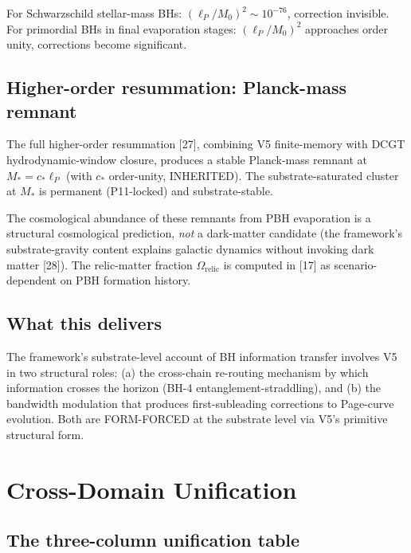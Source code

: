 \documentclass[11pt,a4paper]{article}
\begin{document}
For Schwarzschild stellar-mass BHs: $(\ell_P/M_0)^{2} \sim 10^{-76}$, correction invisible. For primordial BHs in final evaporation stages: $(\ell_P/M_0)^{2}$ approaches order unity, corrections become significant.

\subsection{Higher-order resummation: Planck-mass remnant}

The full higher-order resummation [27], combining V5 finite-memory with DCGT hydrodynamic-window closure, produces a stable Planck-mass remnant at $M_* = c_*\ell_P$ (with $c_*$ order-unity, INHERITED). The substrate-saturated cluster at $M_*$ is permanent (P11-locked) and substrate-stable.

The cosmological abundance of these remnants from PBH evaporation is a structural cosmological prediction, \emph{not} a dark-matter candidate (the framework's substrate-gravity content explains galactic dynamics without invoking dark matter [28]). The relic-matter fraction $\Omega_\mathrm{relic}$ is computed in [17] as scenario-dependent on PBH formation history.

\subsection{What this delivers}

The framework's substrate-level account of BH information transfer involves V5 in two structural roles: (a) the cross-chain re-routing mechanism by which information crosses the horizon (BH-4 entanglement-straddling), and (b) the bandwidth modulation that produces first-subleading corrections to Page-curve evolution. Both are FORM-FORCED at the substrate level via V5's primitive structural form.

\section{Cross-Domain Unification}

\subsection{The three-column unification table}
\end{document}
